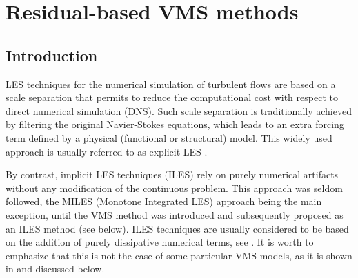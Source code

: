 \chapter{Residual-based VMS methods}
\label{chap-Rb_VMS}
\section{Introduction}
\label{sec-C4_introduction}

LES techniques for the numerical simulation of turbulent flows \cite{Sagaut2006} are based on a scale separation that permits to reduce the computational cost with respect to direct numerical simulation (DNS). Such scale separation is traditionally achieved by filtering the original Navier-Stokes equations, which leads to an extra forcing term defined by a physical (functional or structural) model. This widely used approach is usually referred to as explicit LES \cite{Sagaut2006}.

By contrast, implicit LES techniques (ILES) rely on purely numerical artifacts without any modification of the continuous problem. This approach was seldom followed, the MILES (Monotone Integrated LES) approach \cite{boris_new_1992,Fureby2002,Grinstein2007} being the main exception, until the VMS method was introduced \cite{hughes_multiscale_1995,hughes_variational_1998} and subsequently proposed as an ILES method (see below). ILES techniques are usually considered to be based on the addition of purely dissipative numerical terms, see  \cite[Section 5.3.4]{Sagaut2006}. It is worth to emphasize that this is not the case of some particular VMS models, as it is shown in \cite{principe_dissipative_2010} and discussed below.

